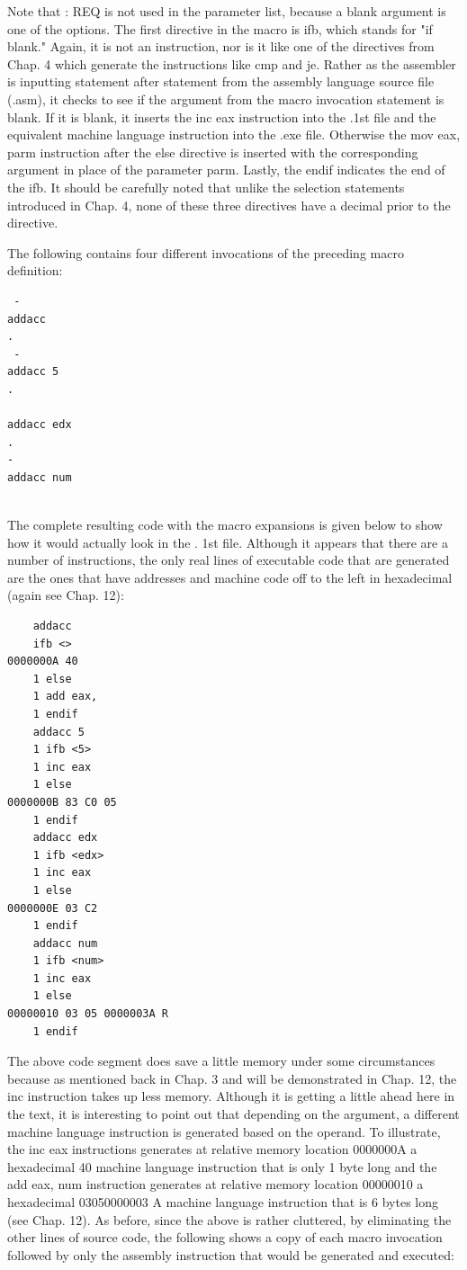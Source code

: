 \documentclass[10pt]{article}
\begin{document}
Note that : REQ is not used in the parameter list, because a blank argument is one of the options. The first directive in the macro is ifb, which stands for "if blank." Again, it is not an instruction, nor is it like one of the directives from Chap. 4 which generate the instructions like cmp and je. Rather as the assembler is inputting statement after statement from the assembly language source file (.asm), it checks to see if the argument from the macro invocation statement is blank. If it is blank, it inserts the inc eax instruction into the .1st file and the equivalent machine language instruction into the .exe file. Otherwise the mov eax, parm instruction after the else directive is inserted with the corresponding argument in place of the parameter parm. Lastly, the endif indicates the end of the ifb. It should be carefully noted that unlike the selection statements introduced in Chap. 4, none of these three directives have a decimal prior to the directive.

The following contains four different invocations of the preceding macro definition:

\begin{verbatim}
 -
addacc
.
 -
addacc 5
.
 
addacc edx
.
-
addacc num
  
\end{verbatim}

The complete resulting code with the macro expansions is given below to show how it would actually look in the . 1st file. Although it appears that there are a number of instructions, the only real lines of executable code that are generated are the ones that have addresses and machine code off to the left in hexadecimal (again see Chap. 12):

\begin{verbatim}
    addacc
    ifb <>
0000000A 40
    1 else
    1 add eax,
    1 endif
    addacc 5
    1 ifb <5>
    1 inc eax
    1 else
0000000B 83 C0 05
    1 endif
    addacc edx
    1 ifb <edx>
    1 inc eax
    1 else
0000000E 03 C2
    1 endif
    addacc num
    1 ifb <num>
    1 inc eax
    1 else
00000010 03 05 0000003A R
    1 endif
\end{verbatim}

The above code segment does save a little memory under some circumstances because as mentioned back in Chap. 3 and will be demonstrated in Chap. 12, the inc instruction takes up less memory. Although it is getting a little ahead here in the text, it is interesting to point out that depending on the argument, a different machine language instruction is generated based on the operand. To illustrate, the inc eax instructions generates at relative memory location 0000000A a hexadecimal 40 machine language instruction that is only 1 byte long and the add eax, num instruction generates at relative memory location 00000010 a hexadecimal 03050000003 A machine language instruction that is 6 bytes long (see Chap. 12). As before, since the above is rather cluttered, by eliminating the other lines of source code, the following shows a copy of each macro invocation followed by only the assembly instruction that would be generated and executed:
\end{document}
